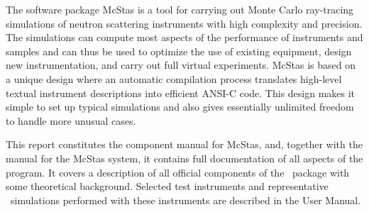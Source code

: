 The software package McStas is a tool for carrying out Monte Carlo
ray-tracing simulations of neutron scattering instruments with high
complexity and precision. The simulations can compute most aspects of the
performance of instruments and samples
and can thus be used to optimize the use of existing equipment,
design new instrumentation, and carry out full virtual experiments.
McStas is based on a unique design where an automatic compilation process
translates high-level textual instrument descriptions into efficient
ANSI-C code. This design makes it simple to set up typical simulations
and also gives essentially unlimited freedom to handle more unusual
cases.

This report constitutes the component manual for McStas, and,
together with the manual for the McStas system, it
contains full documentation of all aspects of the program. It covers
a description of all official components of the \MCS\ package with
some theoretical background. Selected test
instruments and representative \MCS\ simulations performed with these
instruments are described in the User Manual.

